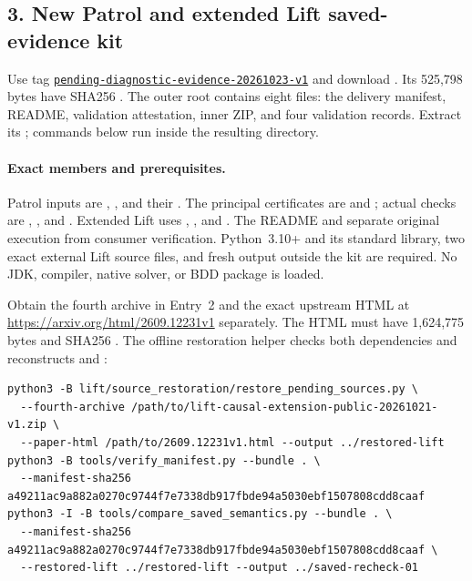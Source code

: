 \subsection*{3. New Patrol and extended Lift saved-evidence kit}
Use tag
\href{https://github.com/research-artifact-archive/seams2027/tree/pending-diagnostic-evidence-20261023-v1}{\nolinkurl{pending-diagnostic-evidence-20261023-v1}}
and download
.
Its 525,798 bytes have SHA256
.
The outer root  contains eight
files: the delivery manifest, README, validation attestation, inner ZIP,
and four validation records. Extract its
; commands below run inside the
resulting  directory.

\paragraph{Exact members and prerequisites.}
Patrol inputs are ,
, and their
. The principal certificates are
 and
; actual checks are
,
, and
.
Extended Lift uses ,
, and .
The README and  separate original execution from
consumer verification. Python~3.10+ and its standard library, two exact
external Lift source files, and fresh output outside the kit are required.
No JDK, compiler, native solver, or BDD package is loaded.

Obtain the fourth archive in Entry~2 and the exact upstream HTML at
\url{https://arxiv.org/html/2609.12231v1} separately. The HTML must have
1,624,775 bytes and SHA256
.
The offline restoration helper checks both dependencies and reconstructs
 and :
\noindent\begin{minipage}{\linewidth}
\begin{lstlisting}
python3 -B lift/source_restoration/restore_pending_sources.py \
  --fourth-archive /path/to/lift-causal-extension-public-20261021-v1.zip \
  --paper-html /path/to/2609.12231v1.html --output ../restored-lift
python3 -B tools/verify_manifest.py --bundle . \
  --manifest-sha256 a49211ac9a882a0270c9744f7e7338db917fbde94a5030ebf1507808cdd8caaf
python3 -I -B tools/compare_saved_semantics.py --bundle . \
  --manifest-sha256 a49211ac9a882a0270c9744f7e7338db917fbde94a5030ebf1507808cdd8caaf \
  --restored-lift ../restored-lift --output ../saved-recheck-01
\end{lstlisting}
\end{minipage}

